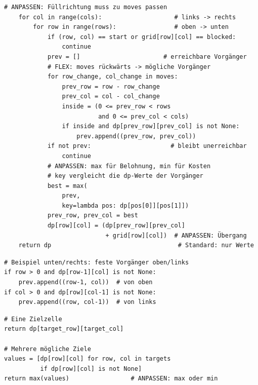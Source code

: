 \begin{codeboxlast}
\begin{lstlisting}[style=CodeExpert]
    # ANPASSEN: Füllrichtung muss zu moves passen
    for col in range(cols):                    # links -> rechts
        for row in range(rows):                # oben -> unten
            if (row, col) == start or grid[row][col] == blocked:
                continue
            prev = []                       # erreichbare Vorgänger
            # FLEX: moves rückwärts -> mögliche Vorgänger
            for row_change, col_change in moves:
                prev_row = row - row_change
                prev_col = col - col_change
                inside = (0 <= prev_row < rows
                          and 0 <= prev_col < cols)
                if inside and dp[prev_row][prev_col] is not None:
                    prev.append((prev_row, prev_col))
            if not prev:                      # bleibt unerreichbar
                continue
            # ANPASSEN: max für Belohnung, min für Kosten
            # key vergleicht die dp-Werte der Vorgänger
            best = max(
                prev,
                key=lambda pos: dp[pos[0]][pos[1]])
            prev_row, prev_col = best
            dp[row][col] = (dp[prev_row][prev_col]
                            + grid[row][col])  # ANPASSEN: Übergang
    return dp                                   # Standard: nur Werte
\end{lstlisting}
\end{codeboxlast}

\begin{codebox}
\begin{lstlisting}[style=CodeExpert]
# Beispiel unten/rechts: feste Vorgänger oben/links
if row > 0 and dp[row-1][col] is not None:
    prev.append((row-1, col))  # von oben
if col > 0 and dp[row][col-1] is not None:
    prev.append((row, col-1))  # von links
\end{lstlisting}
\end{codebox}

\begin{codebox}
\begin{lstlisting}[style=CodeExpert]
# Eine Zielzelle
return dp[target_row][target_col]

# Mehrere mögliche Ziele
values = [dp[row][col] for row, col in targets
          if dp[row][col] is not None]
return max(values)                 # ANPASSEN: max oder min
\end{lstlisting}
\end{codebox}

